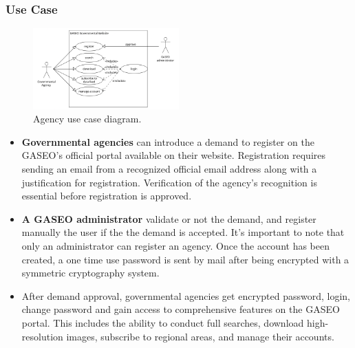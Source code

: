 \documentclass[12pt]{article}
\begin{document}
\subsubsection*{Use Case}
\begin{figure}[h]
    \centering
    \includegraphics[width=0.5\textwidth]{Figures/Business Processes/UseCase_2.png}
    \caption{Agency use case diagram.}
\end{figure}

\begin{itemize}
  \item \textbf{Governmental agencies} can introduce a demand to register on the GASEO's official portal available on their website. Registration requires sending an email from a recognized official email address along with a justification for registration. Verification of the agency's recognition is essential before registration is approved.
  \item  \textbf{A GASEO administrator} validate or not the demand, and register manually the user if the the demand is accepted. It's important to note that only an administrator can register an agency. Once the account has been created, a one time use password is sent by mail after being encrypted with a symmetric cryptography system.
  \item After demand approval, governmental agencies get encrypted password, login, change password and gain access to comprehensive features on the GASEO portal. This includes the ability to conduct full searches, download high-resolution images, subscribe to regional areas, and manage their accounts.
\end{itemize}

\newpage
\end{document}
